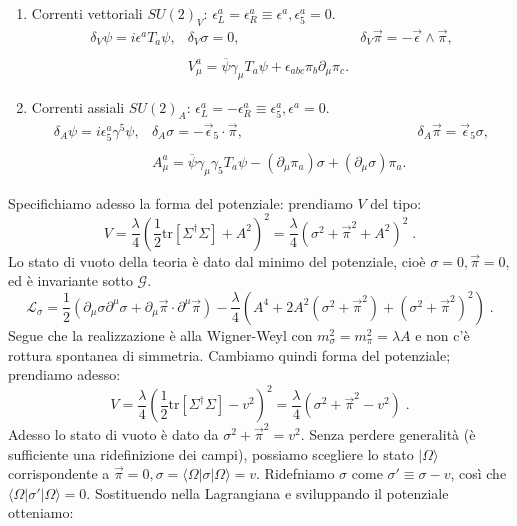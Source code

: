 \documentclass[12pt,a4paper]{article}
\theoremstyle{definition}
\newcommand{\lag}{\mathcal{L}}
\newcommand{\bra}{\langle}
\newcommand{\ket}{\rangle}
\newcommand{\adj}[1]{#1^{\dagger}}
\newcommand{\tr}{\mathrm{tr}}
\numberwithin{equation}{section}
\begin{document}
\begin{enumerate}
\item Correnti vettoriali $SU(2)_V$: $\epsilon_L^a=\epsilon_R^a\equiv\epsilon^a,\epsilon^a_5=0$.
\begin{equation}
\begin{matrix}
\delta_V\psi=i\epsilon^aT_a\psi, & \delta_V\sigma=0, & \delta_V\vec{\pi}=-\vec{\epsilon}\wedge\vec{\pi}, \\
\\
{}  & \boxed{V_{\mu}^a=\overline{\psi}\gamma_{\mu}T_a\psi+\epsilon_{abc}\pi_b\partial_{\mu}\pi_c}. & {}
\end{matrix}
\end{equation}
\item Correnti assiali $SU(2)_A$: $\epsilon_L^a=-\epsilon_R^a\equiv \epsilon^a_5,\epsilon^a=0$.
\begin{equation}
\begin{matrix}
\delta_A\psi=i\epsilon^a_5\gamma^5\psi, & \delta_A\sigma=-\vec{\epsilon}_5\cdot\vec{\pi}, &\delta_A\vec{\pi}=\vec{\epsilon}_5\sigma, \\
\\
{} & \boxed{A_{\mu}^a=\overline{\psi}\gamma_{\mu}\gamma_5T_a\psi-(\partial_{\mu}\pi_a)\sigma+(\partial_{\mu}\sigma)\pi_a}. & {}
\end{matrix}
\end{equation}
\end{enumerate}
Specifichiamo adesso la forma del potenziale: prendiamo $V$ del tipo:
\begin{equation}
V=\frac{\lambda}{4}\left(\frac{1}{2}\tr[\adj{\Sigma}\Sigma]+A^2\right)^2=\frac{\lambda}{4}(\sigma^2+\vec{\pi}^2+A^2)^2\;.
\end{equation}
Lo stato di vuoto della teoria è dato dal minimo del potenziale, cioè $\sigma=0,\vec{\pi}=0$, ed è invariante sotto $\mathcal{G}$.
$$
\lag_{\sigma}=\frac{1}{2}(\partial_{\mu}\sigma\partial^{\mu}\sigma+\partial_{\mu}\vec{\pi}\cdot\partial^{\mu}\vec{\pi})-\frac{\lambda}{4}(A^4+2A^2(\sigma^2+\vec{\pi}^2)+(\sigma^2+\vec{\pi}^2)^2)\;.
$$
Segue che la realizzazione è alla Wigner-Weyl con $m_{\sigma}^2=m_{\pi}^2=\lambda A$ e non c'è rottura spontanea di simmetria. Cambiamo quindi forma del potenziale; prendiamo adesso:
\begin{equation}
V=\frac{\lambda}{4}\left(\frac{1}{2}\tr[\adj{\Sigma}\Sigma]-v^2\right)^2=\frac{\lambda}{4}(\sigma^2+\vec{\pi}^2-v^2)\;.
\end{equation}
Adesso lo stato di vuoto è dato da $\sigma^2+\vec{\pi}^2=v^2$. Senza perdere generalità (è sufficiente una ridefinizione dei campi), possiamo scegliere lo stato $|\Omega\ket$ corrispondente a $\vec{\pi}=0,\sigma=\bra\Omega|\sigma|\Omega\ket=v$. Ridefniamo $\sigma$ come $\sigma'\equiv\sigma-v$, così che $\bra\Omega|\sigma'|\Omega\ket=0$. Sostituendo nella Lagrangiana e sviluppando il potenziale otteniamo:
\end{document}
